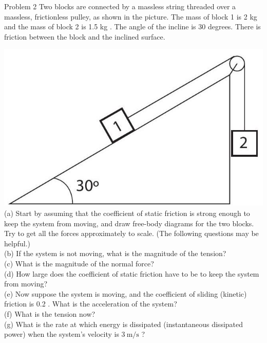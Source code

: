 \documentclass[10pt]{article}
\begin{document}
Problem 2 Two blocks are connected by a massless string threaded over a massless, frictionless pulley, as shown in the picture. The mass of block 1 is 2 kg and the mass of block 2 is 1.5 kg . The angle of the incline is 30 degrees. There is friction between the block and the inclined surface.

\includegraphics[max width=\textwidth, center]{2024_09_14_9969b06773f10b6936e8g-204}\\
(a) Start by assuming that the coefficient of static friction is strong enough to keep the system from moving, and draw free-body diagrams for the two blocks. Try to get all the forces approximately to scale. (The following questions may be helpful.)\\
(b) If the system is not moving, what is the magnitude of the tension?\\
(c) What is the magnitude of the normal force?\\
(d) How large does the coefficient of static friction have to be to keep the system from moving?\\
(e) Now suppose the system is moving, and the coefficient of sliding (kinetic) friction is 0.2 . What is the acceleration of the system?\\
(f) What is the tension now?\\
(g) What is the rate at which energy is dissipated (instantaneous dissipated power) when the system's velocity is $3 \mathrm{~m} / \mathrm{s}$ ?
\end{document}
